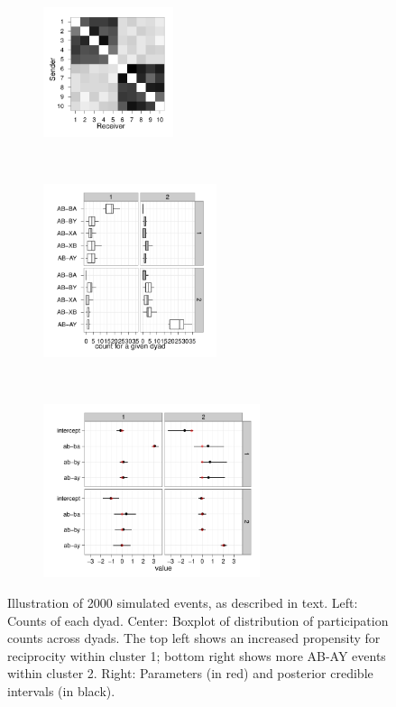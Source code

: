 \begin{figure}
\begin{subfigure}[b]{0.25\textwidth}
\centering
\includegraphics[width=1.5in]{../figs/synthetic/mat.pdf}
\end{subfigure}
~
\begin{subfigure}[b]{0.3\textwidth}
\centering
\includegraphics[width=2in]{../figs/synthetic/counts.pdf}
\end{subfigure}
~
\begin{subfigure}[b]{0.3\textwidth}
\centering
\includegraphics[width=2.5in]{../figs/synthetic/params-estimates.pdf}
\end{subfigure}
\caption{Illustration of 2000 simulated events, as described in text. Left: Counts of each dyad. Center: Boxplot of distribution of participation counts across dyads.  The top left shows an increased propensity for reciprocity within cluster 1; bottom right shows more AB-AY events within cluster 2.  Right: Parameters (in red) and posterior credible intervals (in black).}
\label{fig:syncounts}
\end{figure}

